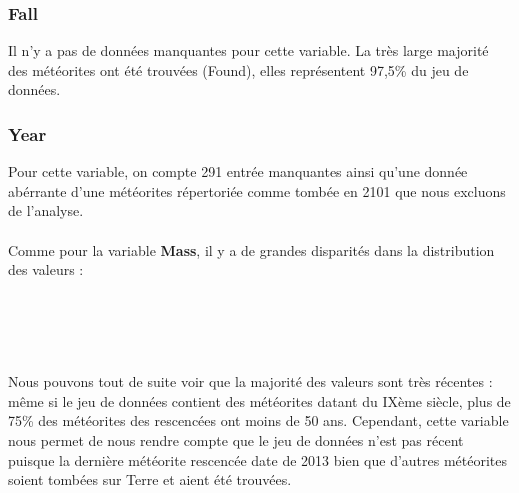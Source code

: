 \documentclass[12pt]{article}
\begin{document}
\subsubsection*{Fall}
Il n'y a pas de données manquantes pour cette variable. La très large majorité des météorites ont été trouvées (Found), elles représentent 97,5\% du jeu de données.
\subsubsection*{Year}
Pour cette variable, on compte 291 entrée manquantes ainsi qu'une donnée abérrante d'une météorites répertoriée comme tombée en 2101 que nous excluons de l'analyse.\\
\\
Comme pour la variable \textbf{Mass}, il y a de grandes disparités dans la distribution des valeurs :\\
\\
\\
\\
\\
Nous pouvons tout de suite voir que la majorité des valeurs sont très récentes : même si le jeu de données contient des météorites datant du IXème siècle, plus de 75\% des météorites des rescencées ont moins de 50 ans. Cependant, cette variable nous permet de nous rendre compte que le jeu de données n'est pas récent puisque la dernière météorite rescencée date de 2013 bien que d'autres météorites soient tombées sur Terre et aient été trouvées.\\
\end{document}
